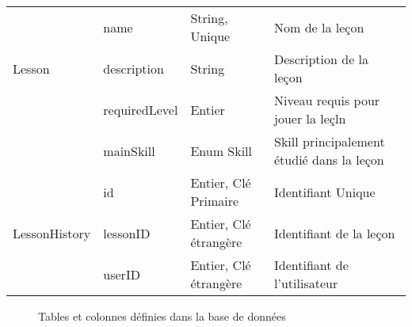 \begin{longtable}[c]{@{}|p{}|p{}|p{}|p{}|@{}}
														& name                                                 & String, Unique                                                                           & Nom de la leçon                                                                          \\* \cline{2-4} 
	\multirow{-3}{*}{Lesson}							& description                                          & String                                                                                   & Description de la leçon                                                                  \\* \cline{2-4} 
														& requiredLevel                                        & Entier                                                                                   & Niveau requis pour jouer la leçln                                                        \\* \cline{2-4} 
							                            & mainSkill                                            & Enum Skill                                                                               & Skill principalement étudié dans la leçon                                                \\* \hline
														& id                                                   & Entier, Clé Primaire                                                                     & Identifiant Unique                                                                       \\* \cline{2-4} 
	\multirow{-2}{*}{LessonHistory}						& lessonID                                             & Entier, Clé étrangère                                                                    & Identifiant de la leçon                                                                  \\* \cline{2-4} 
									                    & userID                                               & Entier, Clé étrangère                                                                    & Identifiant de l'utilisateur                                                             \\* \hline
\end{longtable}
\begin{figure}[H]
	\caption{Tables et colonnes définies dans la base de données}
\end{figure}
